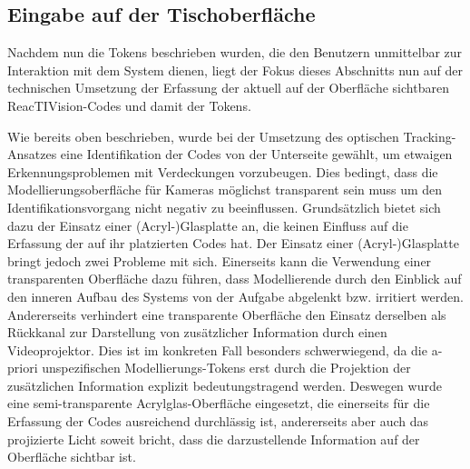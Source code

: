 
\subsection{Eingabe auf der Tischoberfläche} %
\label{sub:input_auf_der_tischoberfläche}

Nachdem nun die Tokens beschrieben wurden, die den Benutzern unmittelbar zur Interaktion mit dem System dienen, liegt der Fokus dieses Abschnitts nun auf der technischen Umsetzung der Erfassung der aktuell auf der Oberfläche sichtbaren ReacTIVision-Codes und damit der Tokens.

Wie bereits oben beschrieben, wurde bei der Umsetzung des optischen Tracking-Ansatzes eine Identifikation der Codes von der Unterseite gewählt, um etwaigen Erkennungsproblemen mit Verdeckungen vorzubeugen. Dies bedingt, dass die Modellierungsoberfläche für Kameras möglichst transparent sein muss um den Identifikationsvorgang nicht negativ zu beeinflussen. Grundsätzlich bietet sich dazu der Einsatz einer (Acryl-)Glasplatte an, die keinen Einfluss auf die Erfassung der auf ihr platzierten Codes hat. Der Einsatz einer (Acryl-)Glasplatte bringt jedoch zwei Probleme mit sich. Einerseits kann die Verwendung einer transparenten Oberfläche dazu führen, dass Modellierende durch den Einblick auf den inneren Aufbau des Systems von der Aufgabe abgelenkt bzw. irritiert werden. Andererseits verhindert eine transparente Oberfläche den Einsatz derselben als Rückkanal zur Darstellung von zusätzlicher Information durch einen Videoprojektor. Dies ist im konkreten Fall besonders schwerwiegend, da die a-priori unspezifischen Modellierungs-Tokens erst durch die Projektion der zusätzlichen Information explizit bedeutungstragend werden. Deswegen wurde eine semi-transparente Acrylglas-Oberfläche eingesetzt, die einerseits für die Erfassung der Codes ausreichend durchlässig ist, andererseits aber auch das projizierte Licht soweit bricht, dass die darzustellende Information auf der Oberfläche sichtbar ist.

